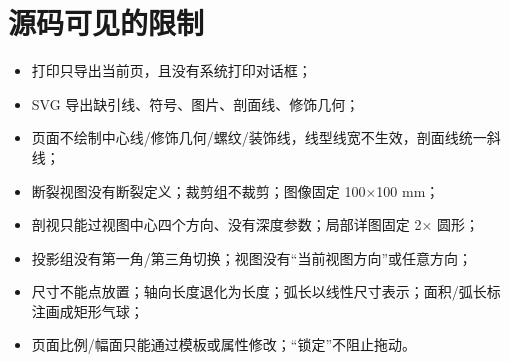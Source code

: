 \section{源码可见的限制}

\begin{itemize}
  \item 打印只导出当前页，且没有系统打印对话框；
  \item SVG 导出缺引线、符号、图片、剖面线、修饰几何；
  \item 页面不绘制中心线/修饰几何/螺纹/装饰线，线型线宽不生效，剖面线统一斜线；
  \item 断裂视图没有断裂定义；裁剪组不裁剪；图像固定 100×100 mm；
  \item 剖视只能过视图中心四个方向、没有深度参数；局部详图固定 2× 圆形；
  \item 投影组没有第一角/第三角切换；视图没有“当前视图方向”或任意方向；
  \item 尺寸不能点放置；轴向长度退化为长度；弧长以线性尺寸表示；面积/弧长标注画成矩形气球；
  \item 页面比例/幅面只能通过模板或属性修改；“锁定”不阻止拖动。
\end{itemize}

